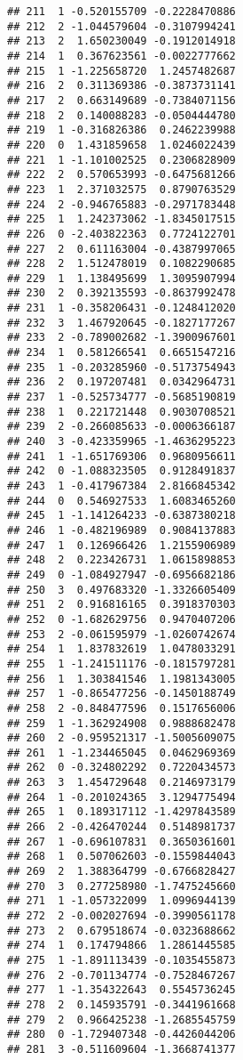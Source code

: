 \documentclass[
]{article}
\begin{document}
\begin{verbatim}
## 211  1 -0.520155709 -0.2228470886
## 212  2 -1.044579604 -0.3107994241
## 213  2  1.650230049 -0.1912014918
## 214  1  0.367623561 -0.0022777662
## 215  1 -1.225658720  1.2457482687
## 216  2  0.311369386 -0.3873731141
## 217  2  0.663149689 -0.7384071156
## 218  2  0.140088283 -0.0504444780
## 219  1 -0.316826386  0.2462239988
## 220  0  1.431859658  1.0246022439
## 221  1 -1.101002525  0.2306828909
## 222  2  0.570653993 -0.6475681266
## 223  1  2.371032575  0.8790763529
## 224  2 -0.946765883 -0.2971783448
## 225  1  1.242373062 -1.8345017515
## 226  0 -2.403822363  0.7724122701
## 227  2  0.611163004 -0.4387997065
## 228  2  1.512478019  0.1082290685
## 229  1  1.138495699  1.3095907994
## 230  2  0.392135593 -0.8637992478
## 231  1 -0.358206431 -0.1248412020
## 232  3  1.467920645 -0.1827177267
## 233  2 -0.789002682 -1.3900967601
## 234  1  0.581266541  0.6651547216
## 235  1 -0.203285960 -0.5173754943
## 236  2  0.197207481  0.0342964731
## 237  1 -0.525734777 -0.5685190819
## 238  1  0.221721448  0.9030708521
## 239  2 -0.266085633 -0.0006366187
## 240  3 -0.423359965 -1.4636295223
## 241  1 -1.651769306  0.9680956611
## 242  0 -1.088323505  0.9128491837
## 243  1 -0.417967384  2.8166845342
## 244  0  0.546927533  1.6083465260
## 245  1 -1.141264233 -0.6387380218
## 246  1 -0.482196989  0.9084137883
## 247  1  0.126966426  1.2155906989
## 248  2  0.223426731  1.0615898853
## 249  0 -1.084927947 -0.6956682186
## 250  3  0.497683320 -1.3326605409
## 251  2  0.916816165  0.3918370303
## 252  0 -1.682629756  0.9470407206
## 253  2 -0.061595979 -1.0260742674
## 254  1  1.837832619  1.0478033291
## 255  1 -1.241511176 -0.1815797281
## 256  1  1.303841546  1.1981343005
## 257  1 -0.865477256 -0.1450188749
## 258  2 -0.848477596  0.1517656006
## 259  1 -1.362924908  0.9888682478
## 260  2 -0.959521317 -1.5005609075
## 261  1 -1.234465045  0.0462969369
## 262  0 -0.324802292  0.7220434573
## 263  3  1.454729648  0.2146973179
## 264  1 -0.201024365  3.1294775494
## 265  1  0.189317112 -1.4297843589
## 266  2 -0.426470244  0.5148981737
## 267  1 -0.696107831  0.3650361601
## 268  1  0.507062603 -0.1559844043
## 269  2  1.388364799 -0.6766828427
## 270  3  0.277258980 -1.7475245660
## 271  1 -1.057322099  1.0996944139
## 272  2 -0.002027694 -0.3990561178
## 273  2  0.679518674 -0.0323688662
## 274  1  0.174794866  1.2861445585
## 275  1 -1.891113439 -0.1035455873
## 276  2 -0.701134774 -0.7528467267
## 277  1 -1.354322643  0.5545736245
## 278  2  0.145935791 -0.3441961668
## 279  2  0.966425238 -1.2685545759
## 280  0 -1.729407348 -0.4426044206
## 281  3 -0.511609604 -1.3668741377

\end{verbatim}
\end{document}
